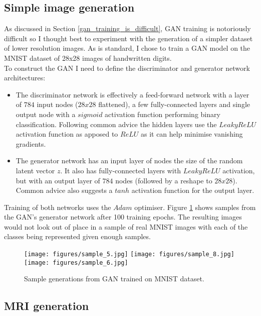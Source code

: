 \documentclass[
    author={Kai Hulme},
    supervisor={Dr Jon Bird},
    degree={BSc},
    title={Generative Adversarial Networks as an Augmentation Technique},
    subtitle={for Alzheimer's Disease Detection in MRI Volumes},
    type={Research},
    year={2021} 
]{dissertation}
\begin{document}
\subsection{Simple image generation}
\label{section:simplegan}

As discussed in Section \ref{gan_training_is_difficult}, GAN training is notoriously difficult so I thought best to experiment with the generation of a simpler dataset of lower resolution images. As is standard, I chose to train a GAN model on the MNIST dataset of 28x28 images of handwritten digits. \\

To construct the GAN I need to define the discriminator and generator network architectures:

\begin{itemize}
    \item The discriminator network is effectively a feed-forward network with a layer of $784$ input nodes ($28x28$ flattened), a few fully-connected layers and single output node with a $sigmoid$ activation function performing binary classification. Following common advice the hidden layers use the $LeakyReLU$ activation function as apposed to $ReLU$ as it can help minimise vanishing gradients.
    \item The generator network has an input layer of nodes the size of the random latent vector $z$. It also has fully-connected layers with $LeakyReLU$ activation, but with an output layer of $784$ nodes (followed by a reshape to $28x28$). Common advice also suggests a $tanh$ activation function for the output layer.
\end{itemize}

Training of both networks uses the $Adam$ optimiser. Figure \ref{mnist_gen_samples} shows samples from the GAN's generator network after 100 training epochs. The resulting images would not look out of place in a sample of real MNIST images with each of the classes being represented given enough samples.

\begin{figure}[t]
    \label{mnist_gen_samples}
    \centering
    \texttt{[image: figures/sample\_5.jpg]}
    \texttt{[image: figures/sample\_8.jpg]}
    \texttt{[image: figures/sample\_6.jpg]}
    \caption{Sample generations from GAN trained on MNIST dataset.}
\end{figure}
	
\subsection{MRI generation}
\end{document}
